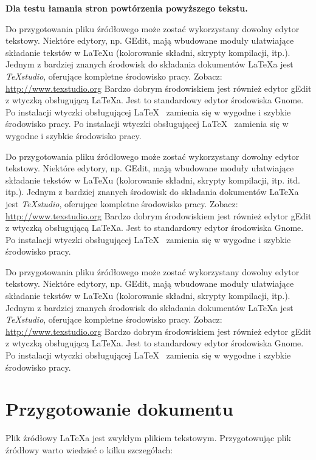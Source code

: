 \textbf{Dla testu łamania stron powtórzenia powyższego tekstu.}


Do przygotowania pliku źródłowego może zostać wykorzystany dowolny edytor tekstowy. Niektóre edytory, np. GEdit, mają wbudowane moduły ułatwiające składanie tekstów w LaTeXu (kolorowanie składni, skrypty kompilacji, itp.).
Jednym z bardziej znanych środowisk do składania dokumentów  \LaTeX a jest {\em TeXstudio}, oferujące kompletne środowisko pracy. Zobacz: \url{http://www.texstudio.org}
Bardzo dobrym środowiskiem jest również edytor gEdit z wtyczką obsługującą \LaTeX a. Jest to standardowy edytor środowiska Gnome. Po instalacji wtyczki obsługującej \LaTeX~ zamienia się w wygodne i szybkie środowisko pracy.
Po instalacji wtyczki obsługującej \LaTeX~ zamienia się w wygodne i szybkie środowisko pracy.

Do przygotowania pliku źródłowego może zostać wykorzystany dowolny edytor tekstowy. Niektóre edytory, np. GEdit, mają wbudowane moduły ułatwiające składanie tekstów w LaTeXu (kolorowanie składni, skrypty kompilacji, itp. itd. itp.).
Jednym z bardziej znanych środowisk do składania dokumentów  \LaTeX a jest {\em TeXstudio}, oferujące kompletne środowisko pracy. Zobacz: \url{http://www.texstudio.org}
Bardzo dobrym środowiskiem jest również edytor gEdit z wtyczką obsługującą \LaTeX a. Jest to standardowy edytor środowiska Gnome. Po instalacji wtyczki obsługującej \LaTeX~ zamienia się w wygodne i szybkie środowisko pracy.

Do przygotowania pliku źródłowego może zostać wykorzystany dowolny edytor tekstowy. Niektóre edytory, np. GEdit, mają wbudowane moduły ułatwiające składanie tekstów w LaTeXu (kolorowanie składni, skrypty kompilacji, itp.).
Jednym z bardziej znanych środowisk do składania dokumentów  \LaTeX a jest {\em TeXstudio}, oferujące kompletne środowisko pracy. Zobacz: \url{http://www.texstudio.org}
Bardzo dobrym środowiskiem jest również edytor gEdit z wtyczką obsługującą \LaTeX a. Jest to standardowy edytor środowiska Gnome. Po instalacji wtyczki obsługującej \LaTeX~ zamienia się w wygodne i szybkie środowisko pracy.


\section{Przygotowanie dokumentu}
\label{sec:przygotowanieDokumentu}

Plik źródłowy \LaTeX a jest zwykłym plikiem tekstowym. Przygotowując plik
źródłowy warto wiedzieć o kilku szczegółach:

